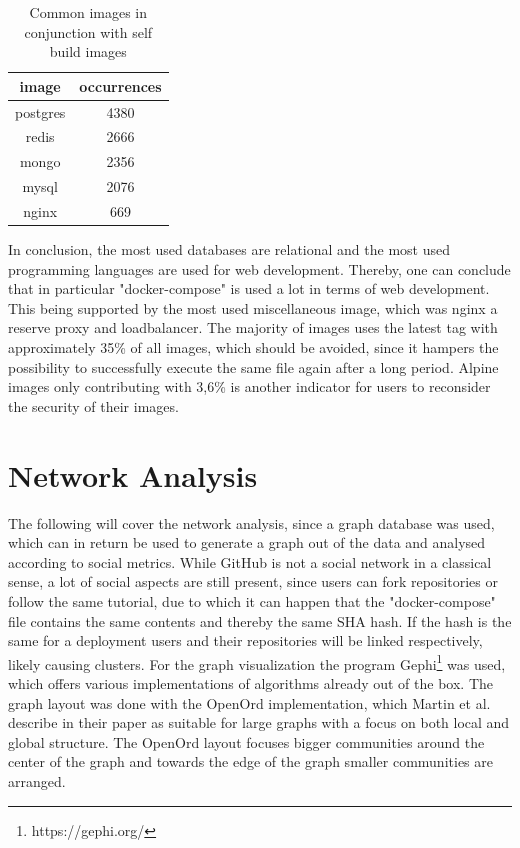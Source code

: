 \begin{table}[h!]
    \centering
    \begin{tabular}{ |c|c| }
    \hline
    image & occurrences \\
    \hline
         postgres & 4380 \\
         redis & 2666 \\
         mongo & 2356 \\
         mysql & 2076 \\
         nginx & 669 \\
    \hline
    \end{tabular}
    \caption{Common images in conjunction with self build images}
    \label{self_build_commons}
\end{table}

In conclusion, the most used databases are relational and the most used programming languages are used for web development. Thereby, one can conclude that in particular "docker-compose" is used a lot in terms of web development. This being supported by the most used miscellaneous image, which was nginx a reserve proxy and loadbalancer. The majority of images uses the latest tag with approximately 35\% of all images, which should be avoided, since it hampers the possibility to successfully execute the same file again after a long period. Alpine images only contributing with 3,6\% is another indicator for users to reconsider the security of their images.

\section{Network Analysis}

The following will cover the network analysis, since a graph database was used, which can in return be used to generate a graph out of the data and analysed according to social metrics. While GitHub is not a social network in a classical sense, a lot of social aspects are still present, since users can fork repositories or follow the same tutorial, due to which it can happen that the "docker-compose" file contains the same contents and thereby the same SHA hash. If the hash is the same for a deployment users and their repositories will be linked respectively, likely causing clusters.
For the graph visualization the program Gephi\footnote{https://gephi.org/} was used, which offers various implementations of algorithms already out of the box. The graph layout was done with the OpenOrd implementation, which Martin et al. describe in their paper as suitable for large graphs with a focus on both local and global structure\cite{openOrd}. The OpenOrd layout focuses bigger communities around the center of the graph and towards the edge of the graph smaller communities are arranged.

